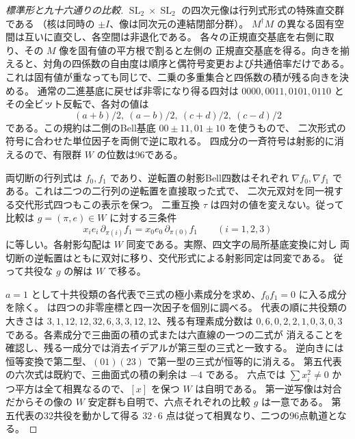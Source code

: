 \begin{proof}[標準形と九十六通りの比較]
$\operatorname{SL}_2\times\operatorname{SL}_2$ の四次元像は行列式形式の特殊直交群である
（核は同時の $\pm I$、像は同次元の連結閉部分群）。
$M^\dagger M$ の異なる固有空間は互いに直交し、各空間は非退化である。
各々の正規直交基底を右側に取り、その $M$ 像を固有値の平方根で割ると左側の
正規直交基底を得る。向きを揃えると、対角の四係数の自由度は順序と偶符号変更および共通倍率だけである。
これは固有値が重なっても同じで、二乗の多重集合と四係数の積が残る向きを決める。
通常の二進基底に戻せば非零になり得る四対は
$0000,0011,0101,0110$ とその全ビット反転で、各対の値は
\[
             (a+b)/2,\ (a-b)/2,\ (c+d)/2,\ (c-d)/2
\]
である。この規約は二側のBell基底 $00\pm11,01\pm10$ を使うもので、
二次形式の符号に合わせた単位因子を両側で逆に取れる。
四成分の一斉符号は射影的に消えるので、有限群 $W$ の位数は96である。

両切断の行列式は $f_0,f_1$ であり、逆転置の射影Bell四数はそれぞれ
$\nabla f_0,\nabla f_1$ である。これは二つの二行列の逆転置を直接取った式で、
二次元双対を同一視する交代形式四つもこの表示を保つ。
二重互換 $\tau$ は四対の値を変えない。従って比較は $g=(\pi,e)\in W$ に対する三条件
\[
  x_i e_i\,\partial_{\pi(i)}f_1=x_0 e_0\,\partial_{\pi(0)}f_1
                    \qquad(i=1,2,3)
\]
に等しい。各射影勾配は $W$ 同変である。実際、四文字の局所基底変換に対し
両切断の逆転置はともに双対に移り、交代形式による射影同定は同変である。
従って共役な $g$ の解は $W$ で移る。

$a=1$ として十共役類の各代表で三式の極小素成分を求め、$f_0f_1=0$ に入る成分を除く。
 は四つの非零座標と四一次因子を個別に調べる。
代表の順に共役類の大きさは $3,1,12,12,32,6,3,3,12,12$、残る有理素成分数は
$0,6,0,2,2,1,0,3,0,3$ である。各素成分で三曲面の積の式または六直線の一つの二式が
消えることを確認し、残る一成分では消去イデアルが第三型の三式と一致する。
逆向きには恒等変換で第二型、$(01)(23)$ で第一型の三式が恒等的に消える。
第五代表の六次式は既約で、三曲面式の積の剰余は $-4$ である。
六点では $\sum x_i^2\ne0$ かつ平方は全て相異なるので、$[x]$ を保つ $W$ は自明である。
第一逆写像は対合だからその像の $W$ 安定群も自明で、六点それぞれの比較 $g$ は一意である。
第五代表の32共役を動かして得る $32\cdot6$ 点は従って相異なり、二つの96点軌道となる。
\end{proof}

